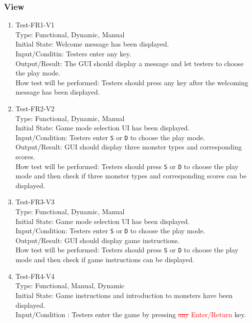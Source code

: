 \documentclass[12pt]{article}
\begin{document}
\subsubsection{View}
\begin{enumerate}[1.]
\item Test-FR1-V1\\
Type: Functional, Dynamic, Manual\\
Initial State: Welcome message has been displayed.\\
Input/Conditin: Testers enter any key.\\
Output/Result: The GUI should display a message and let testers
to choose the play mode.\\
How test will be performed: Testers should press any 
key after the welcoming message has been displayed. 
\item Test-FR2-V2\\
Type: Functional, Dynamic, Manual\\
Initial State: Game mode selection UI has been displayed.\\
Input/Condition: Testers enter \verb|S| or \verb|D| to
choose the play mode.\\
Output/Result: GUI should display three monster types and corresponding scores.\\
How test will be performed: Testers should press \verb|S| or \verb|D| to
choose the play mode and then check if three monster 
types and corresponding scores can be displayed.
\item Test-FR3-V3\\
Type: Functional, Dynamic, Manual\\
Initial State: Game mode selection UI has been displayed.\\
Input/Condition: Testers enter \verb|S| or \verb|D| to
choose the play mode.\\
Output/Result: GUI should display game instructions.\\
How test will be performed: Testers should press \verb|S| or \verb|D| to
choose the play mode and then check if 
game instructions can be displayed.
\item Test-FR4-V4\\
Type: Functional, Manual, Dynamic\\
Initial State:  Game instructions and introduction to 
monsters have been displayed.\\
Input/Condition
: Testers enter the game by pressing \textcolor{red}{\st{any} Enter/Return} key.\\

\end{enumerate}
\end{document}

